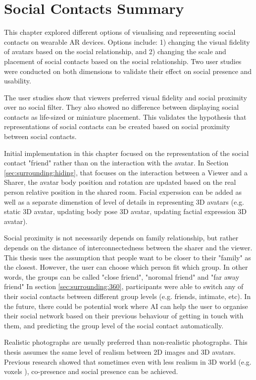 \pagebreak
\section{Social Contacts Summary}

This chapter explored different options of visualising and representing social contacts on wearable AR devices. Options include: 1) changing the visual fidelity of avatars based on the social relationship, and 2) changing the scale and placement of social contacts based on the social relationship. Two user studies were conducted on both dimensions to validate their effect on social presence and usability. 

The user studies show that viewers preferred visual fidelity and social proximity over no social filter. They also showed no difference between displaying social contacts as life-sized or miniature placement. This validates the hypothesis that representations of social contacts can be created based on social proximity between social contacts. 

Initial implementation in this chapter focused on the representation of the social contact "friend" rather than on the interaction with the avatar. In Section \ref{sec:surrounding:hiding}, that focuses on the interaction between a Viewer and a Sharer, the avatar body position and rotation are updated based on the real person relative position in the shared room. Facial experssion can be added as well as a separate dimenstion of level of details in representing 3D avatars (e.g. static 3D avatar, updating body pose 3D avatar, updating factial expression 3D avatar).

Social proximity is not necessarily depends on family relationship, but rather depends on the distance of interconnectedness between the sharer and the viewer. This thesis uses the assumption that people want to be closer to their "family" as the closest. However, the user can choose which person fit which group. In other words, the groups can be called "close friend", "noromal friend" and "far away friend" In section \ref{sec:surrounding:360}, participants were able to switch any of their social contacts between different group levels (e.g. friends, intimate, etc). In the future, there could be potential work where AI can help the user to organise their social network based on their previous behaviour of getting in touch with them, and predicting the group level of the social contact automatically.  

Realistic photographs are usually preferred than non-realistic photographs. This thesis assumes the same level of realism between 2D images and 3D avatars. Previous research showed that sometimes even with less realism in 3D world (e.g. voxels \cite{Regenbrecht2017}), co-presence and social presence can be achieved. 

